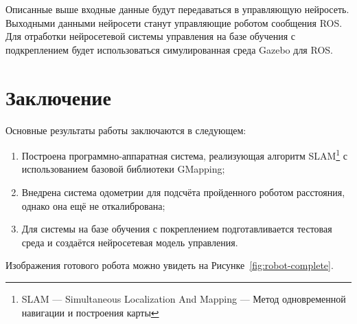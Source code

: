 \documentclass[12pt,a4paper]{scrartcl}
\begin{document}
			Описанные выше входные данные будут передаваться в управляющую нейросеть. Выходными данными нейросети станут управляющие роботом сообщения ROS. Для отработки нейросетевой системы управления на базе обучения с подкреплением будет использоваться симулированная среда Gazebo для ROS.
			
		\section*{Заключение}
			Основные результаты работы заключаются в следующем:
			\begin{enumerate}
				\item Построена программно-аппаратная система, реализующая алгоритм SLAM\footnote{SLAM — Simultaneous Localization And Mapping — Метод одновременной навигации и построения карты\cite{bib:SLAMDef}} с использованием базовой библиотеки GMapping;
				\item Внедрена система одометрии для подсчёта пройденного роботом расстояния, однако она ещё не откалибрована;
				\item Для системы на базе обучения с покреплением подготавливается тестовая среда и создаётся нейросетевая модель управления.
			\end{enumerate}
			
			Изображения готового робота можно увидеть на Рисунке~\ref{fig:robot-complete}.
			
\end{document}

